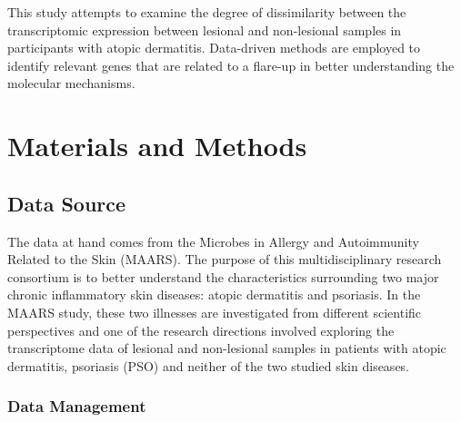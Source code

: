 \documentclass[journal, a4paper]{IEEEtran}
\begin{document}
This study attempts to examine the degree of dissimilarity between the transcriptomic expression between lesional and non-lesional samples in participants with atopic dermatitis. Data-driven methods are employed to identify relevant genes that are related to a flare-up in better understanding the molecular mechanisms.

\section{\textbf{Materials and Methods}}

\subsection{\textbf{Data Source}}

The data at hand comes from the Microbes in Allergy and Autoimmunity Related to the Skin (MAARS). The purpose of this multidisciplinary research consortium is to better understand the characteristics surrounding two major chronic inflammatory skin diseases: atopic dermatitis and psoriasis\cite{MAARS}. In the MAARS study, these two illnesses are investigated from different scientific perspectives and one of the research directions involved exploring the transcriptome data of lesional and non-lesional samples in patients with atopic dermatitis, psoriasis (PSO) and neither of the two studied skin diseases.\\


\subsubsection*{\textbf{Data Management}}
\end{document}

